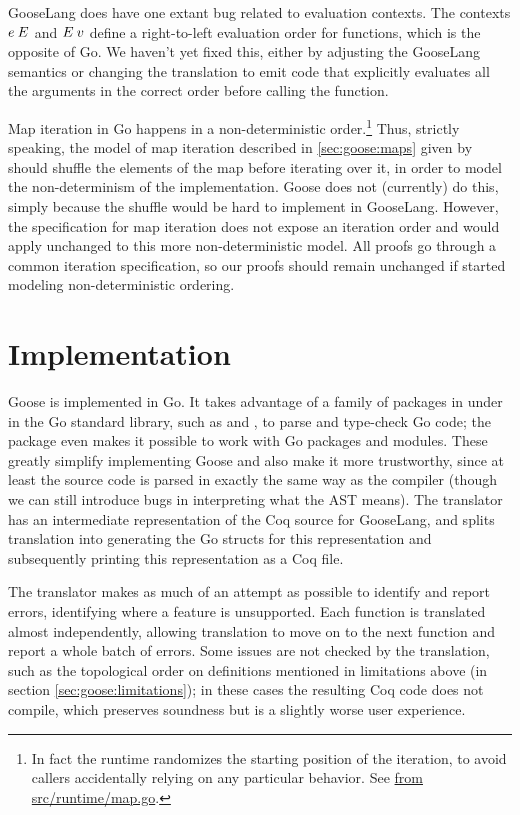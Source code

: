 GooseLang does have one extant bug related to evaluation contexts. The contexts
$e \: E$ and $E \: v$ define a right-to-left evaluation order for functions,
which is the opposite of Go. We haven't yet fixed this, either by adjusting the
GooseLang semantics or changing the translation to emit code that explicitly
evaluates all the arguments in the correct order before calling the function.

Map iteration in Go happens in a non-deterministic order.\footnote{In fact the
runtime randomizes the starting position of the iteration, to avoid callers
accidentally relying on any particular behavior. See
\href{https://github.com/golang/go/blob/c379c3d58d5482f4c8fe97466a99ce70e630ad44/src/runtime/map.go\#L844-L850}%
{ from src/runtime/map.go}.} Thus, strictly speaking, the model
of map iteration described in \cref{sec:goose:maps} given by  should
shuffle the elements of the map before iterating over it, in order to model the
non-determinism of the implementation. Goose does not (currently) do this,
simply because the shuffle would be hard to implement in GooseLang. However, the
specification for map iteration does not expose an iteration order and would
apply unchanged to this more non-deterministic model. All proofs go through a
common iteration specification, so our proofs should remain unchanged if
 started modeling non-deterministic ordering.

\section{Implementation}%
\label{sec:goose:impl}

Goose is implemented in Go. It takes advantage of a family of packages in under
 in the Go standard library, such as  and , to
parse and type-check Go code; the  package
even makes it possible to work with Go packages and modules. These greatly
simplify implementing Goose and also make it more trustworthy, since at least
the source code is parsed in exactly the same way as the compiler (though we can
still introduce bugs in interpreting what the AST means).
The translator has an intermediate representation of the Coq source for
GooseLang, and splits translation into generating the Go structs for this
representation and subsequently printing this representation as a Coq file.

The translator makes as much of an attempt as possible to identify and report
errors, identifying where a feature is unsupported. Each function is translated
almost independently, allowing translation to move on to the next function and
report a whole batch of errors. Some issues are not checked by the translation,
such as the topological order on definitions mentioned in limitations above (in
section \cref{sec:goose:limitations}); in these cases the resulting Coq code
does not compile, which preserves soundness but is a slightly worse user
experience.

